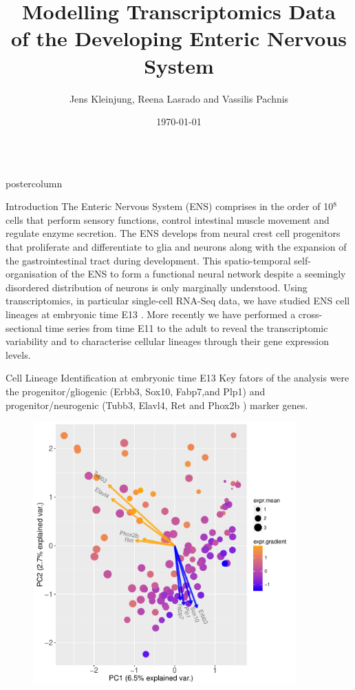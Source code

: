 \documentclass{beamer}
\title{\huge  Modelling Transcriptomics Data \\of the Developing Enteric Nervous System}
\author{Jens Kleinjung, Reena Lasrado and Vassilis Pachnis}
\institute[]{The Francis Crick Institute}
\date{\today}
\newlength{\columnheight}
\begin{document}
\begin{frame}
\begin{columns}
\begin{column}{.45\textwidth}
\begin{beamercolorbox}[center]{postercolumn}
\begin{minipage}{.98\textwidth}  %
\parbox[t][\columnheight]{\textwidth}{ %
\begin{myblock}{Introduction}
The Enteric Nervous System (ENS) comprises in the order of 10$^8$ cells that
perform sensory functions, control intestinal muscle movement and regulate
enzyme secretion. The ENS develops from neural crest cell progenitors that
proliferate and differentiate to glia and neurons along with the expansion
of the gastrointestinal tract during development.
This spatio-temporal self-organisation of the ENS to form a functional
neural network despite a seemingly disordered distribution of neurons is
only marginally understood.
Using transcriptomics, in particular single-cell RNA-Seq data, we have studied
ENS cell lineages at embryonic time E13 \cite{Lasrado_2017}.
More recently we have performed a cross-sectional time series from time E11 to
the adult to reveal the transcriptomic variability and to characterise cellular
lineages through their gene expression levels.
\end{myblock}\vfill
\begin{myblock}{Cell Lineage Identification at embryonic time E13}
Key fators of the analysis were the
progenitor/gliogenic (Erbb3, Sox10, Fabp7,and Plp1) and
progenitor/neurogenic (Tubb3, Elavl4, Ret and Phox2b )
marker genes.
\begin{figure}
\begin{minipage}{0.9\textwidth}
	\includegraphics[width=0.9\textwidth]{./biplot_semisuperv}

\end{minipage}
\end{figure}
\end{myblock}}
\end{minipage}
\end{beamercolorbox}
\end{column}
\end{columns}
\end{frame}
\end{document}
